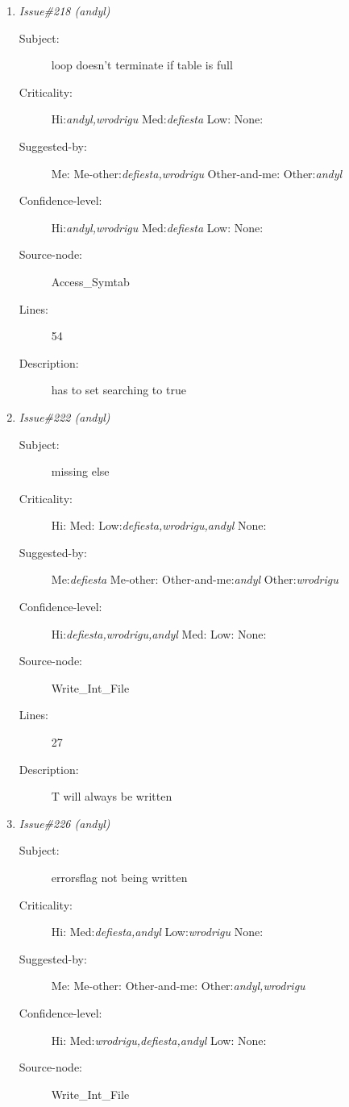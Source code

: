 \begin{enumerate}
\begin{description}
\item [Lines:] 32

\item [Description:] while loop will only be executed once
\end{description}
\item {\it Issue\#218 (andyl)}
\begin{description}
\item [Subject:] loop doesn't terminate if table is full
\item [Criticality:] Hi:{\it andyl,wrodrigu} Med:{\it defiesta} Low:{\it } None:{\it }
\item [Suggested-by:] Me:{\it } Me-other:{\it defiesta,wrodrigu} Other-and-me:{\it } Other:{\it andyl}
\item [Confidence-level:] Hi:{\it andyl,wrodrigu} Med:{\it defiesta} Low:{\it } None:{\it }
\item [Source-node:] Access\_Symtab

\item [Lines:] 54

\item [Description:] has to set searching to true
\end{description}
\item {\it Issue\#222 (andyl)}
\begin{description}
\item [Subject:] missing else
\item [Criticality:] Hi:{\it } Med:{\it } Low:{\it defiesta,wrodrigu,andyl} None:{\it }
\item [Suggested-by:] Me:{\it defiesta} Me-other:{\it } Other-and-me:{\it andyl} Other:{\it wrodrigu}
\item [Confidence-level:] Hi:{\it defiesta,wrodrigu,andyl} Med:{\it } Low:{\it } None:{\it }
\item [Source-node:] Write\_Int\_File

\item [Lines:] 27

\item [Description:] T will always be written
\end{description}
\item {\it Issue\#226 (andyl)}
\begin{description}
\item [Subject:] errorsflag not being written
\item [Criticality:] Hi:{\it } Med:{\it defiesta,andyl} Low:{\it wrodrigu} None:{\it }
\item [Suggested-by:] Me:{\it } Me-other:{\it } Other-and-me:{\it } Other:{\it andyl,wrodrigu}
\item [Confidence-level:] Hi:{\it } Med:{\it wrodrigu,defiesta,andyl} Low:{\it } None:{\it }
\item [Source-node:] Write\_Int\_File


\end{description}
\end{enumerate}
